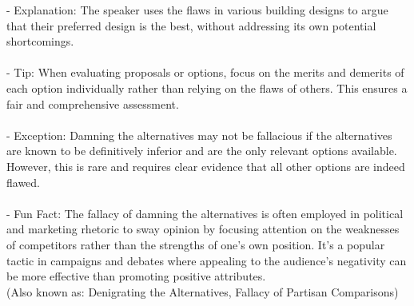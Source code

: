 \documentclass[a4paper,12pt,single,pdftex]{scrartcl}
\begin{document}
    
        - Explanation: The speaker uses the flaws in various building designs to argue that their preferred design is the best, without addressing its own potential shortcomings.
    \\

    
      
    \\

    
      - Tip: When evaluating proposals or options, focus on the merits and demerits of each option individually rather than relying on the flaws of others. This ensures a fair and comprehensive assessment.
    \\

    
      
    \\

    
      - Exception: Damning the alternatives may not be fallacious if the alternatives are known to be definitively inferior and are the only relevant options available. However, this is rare and requires clear evidence that all other options are indeed flawed.
    \\

    
      
    \\

    
      - Fun Fact: The fallacy of damning the alternatives is often employed in political and marketing rhetoric to sway opinion by focusing attention on the weaknesses of competitors rather than the strengths of one’s own position. It’s a popular tactic in campaigns and debates where appealing to the audience’s negativity can be more effective than promoting positive attributes.
    \\

  
    
      (Also known as: Denigrating the Alternatives, Fallacy of Partisan Comparisons)
    \\
\end{document}
